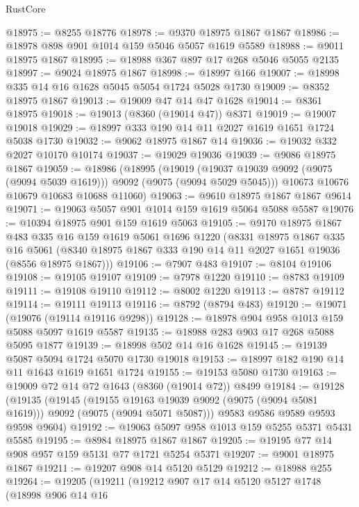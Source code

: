 \begin{lexlean}{RustCore}
\begin{coremodule}
@18975 := @8255 @18776
@18978 := @9370 @18975 @1867 @1867
@18986 := @18978 @898 @901 @1014 @159 @5046 @5057 @1619 @5589
@18988 := @9011 @18975 @1867
@18995 := @18988 @367 @897 @17 @268 @5046 @5055 @2135
@18997 := @9024 @18975 @1867
@18998 := @18997 @166
@19007 := @18998 @335 @14 @16 @1628 @5045 @5054 @1724 @5028 @1730
@19009 := @8352 @18975 @1867
@19013 := @19009 @47 @14 @47 @1628
@19014 := @8361 @18975
@19018 := @19013 (@8360 (@19014 @47)) @8371
@19019 := @19007 @19018
@19029 := @18997 @333 @190 @14 @11 @2027 @1619 @1651 @1724 @5038 @1730
@19032 := @9062 @18975 @1867 @14
@19036 := @19032 @332 @2027 @10170 @10174
@19037 := @19029 @19036
@19039 := @9086 @18975 @1867
@19059 := @18986
    (@18995
      (@19019 (@19037 @19039 @9092 (@9075 (@9094 @5039 @1619))) @9092 (@9075 (@9094 @5029 @5045)))
      @10673
      @10676
      @10679
      @10683
      @10688
      @11060)
@19063 := @9610 @18975 @1867 @1867 @9614
@19071 := @19063 @5057 @901 @1014 @159 @1619 @5064 @5088 @5587
@19076 := @10394 @18975 @901 @159 @1619 @5063
@19105 := @9170
    @18975
    @1867
    @483
    @335
    @16
    @159
    @1619
    @5061
    @1696
    @1220
    (@8331
      @18975
      @1867
      @335
      @16
      @5061
      (@8340 @18975 @1867 @333 @190 @14 @11 @2027 @1651 @19036 (@8556 @18975 @1867)))
@19106 := @7907 @483
@19107 := @8104 @19106
@19108 := @19105 @19107
@19109 := @7978 @1220
@19110 := @8783 @19109
@19111 := @19108 @19110
@19112 := @8002 @1220
@19113 := @8787 @19112
@19114 := @19111 @19113
@19116 := @8792 (@8794 @483)
@19120 := @19071 (@19076 (@19114 @19116 @9298))
@19128 := @18978 @904 @958 @1013 @159 @5088 @5097 @1619 @5587
@19135 := @18988 @283 @903 @17 @268 @5088 @5095 @1877
@19139 := @18998 @502 @14 @16 @1628
@19145 := @19139 @5087 @5094 @1724 @5070 @1730 @19018
@19153 := @18997 @182 @190 @14 @11 @1643 @1619 @1651 @1724
@19155 := @19153 @5080 @1730
@19163 := @19009 @72 @14 @72 @1643 (@8360 (@19014 @72)) @8499
@19184 := @19128
    (@19135
      (@19145
        (@19155 @19163 @19039 @9092 (@9075 (@9094 @5081 @1619)))
        @9092
        (@9075 (@9094 @5071 @5087)))
      @9583
      @9586
      @9589
      @9593
      @9598
      @9604)
@19192 := @19063 @5097 @958 @1013 @159 @5255 @5371 @5431 @5585
@19195 := @8984 @18975 @1867 @1867
@19205 := @19195 @77 @14 @908 @957 @159 @5131 @77 @1721 @5254 @5371
@19207 := @9001 @18975 @1867
@19211 := @19207 @908 @14 @5120 @5129
@19212 := @18988 @255
@19264 := @19205
    (@19211
      (@19212
        @907
        @17
        @14
        @5120
        @5127
        @1748
        (@18998
          @906
          @14
          @16

\end{coremodule}
\end{lexlean}
